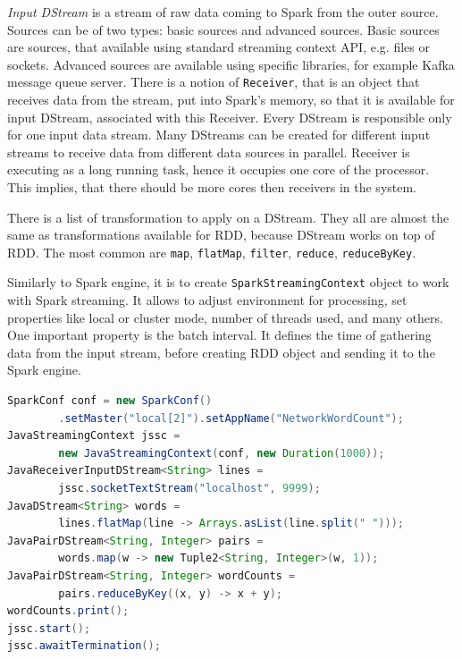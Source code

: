 \textit{Input DStream} is a stream of raw data coming to Spark from the outer source.
Sources can be of two types: basic sources and advanced sources.
Basic sources are sources, that available using standard streaming context API, e.g. files or sockets.
Advanced sources are available using specific libraries, for example Kafka message queue server.
There is a notion of \lstinline{Receiver}, that is an object that receives data from the stream, put into Spark's memory, so that it is available for input DStream, associated with this Receiver.
Every DStream is responsible only for one input data stream.
Many DStreams can be created for different input streams to receive data from different data sources in parallel.
Receiver is executing as a long running task, hence it occupies one core of the processor.
This implies, that there should be more cores then receivers in the system.

There is a list of transformation to apply on a DStream.
They all are almost the same as transformations available for RDD, because DStream works on top of RDD.
The most common are \lstinline{map}, \lstinline{flatMap}, \lstinline{filter}, \lstinline{reduce}, \lstinline{reduceByKey}.

Similarly to Spark engine, it is to create \lstinline{SparkStreamingContext} object to work with Spark streaming.
It allows to adjust environment for processing, set properties like local or cluster mode, number of threads used, and many others.
One important property is the batch interval.
It defines the time of gathering data from the input stream, before creating RDD object and sending it to the Spark engine.

\begin{lstlisting}[float=h, caption=Example of DStream usage., label=listing:DStreamExampleCode, language=Java]
SparkConf conf = new SparkConf()
		.setMaster("local[2]").setAppName("NetworkWordCount");
JavaStreamingContext jssc =
		new JavaStreamingContext(conf, new Duration(1000));
JavaReceiverInputDStream<String> lines =
		jssc.socketTextStream("localhost", 9999);
JavaDStream<String> words =
		lines.flatMap(line -> Arrays.asList(line.split(" ")));
JavaPairDStream<String, Integer> pairs =
		words.map(w -> new Tuple2<String, Integer>(w, 1));
JavaPairDStream<String, Integer> wordCounts =
		pairs.reduceByKey((x, y) -> x + y);
wordCounts.print();
jssc.start();
jssc.awaitTermination();
\end{lstlisting}

